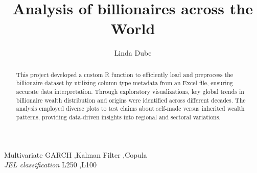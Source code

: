 \documentclass[11pt,preprint]{elsarticle}
\numberwithin{equation}{section}
\numberwithin{figure}{section}
\numberwithin{table}{section}
\begin{document}
\begin{frontmatter}  %

\title{Analysis of billionaires across the World}





\author[Add1]{Linda Dube}





\address[Add1]{Stellenbosch University, Western Cape}


\begin{abstract}
\small{
This project developed a custom R function to efficiently load and
preprocess the billionaire dataset by utilizing column type metadata
from an Excel file, ensuring accurate data interpretation. Through
exploratory visualizations, key global trends in billionaire wealth
distribution and origins were identified across different decades. The
analysis employed diverse plots to test claims about self-made versus
inherited wealth patterns, providing data-driven insights into regional
and sectoral variations.
}
\end{abstract}

\vspace{1cm}


\begin{keyword}
\footnotesize{
Multivariate GARCH \sep Kalman Filter \sep Copula \\
\vspace{0.3cm}
}
\footnotesize{
\textit{JEL classification} L250 \sep L100
}
\end{keyword}



\vspace{0.5cm}

\end{frontmatter}

\setcounter{footnote}{0}



\pagestyle{fancy}
\chead{}
\rhead{}
\lfoot{}
\lhead{}
\cfoot{}


\headsep 35pt %
\end{document}
